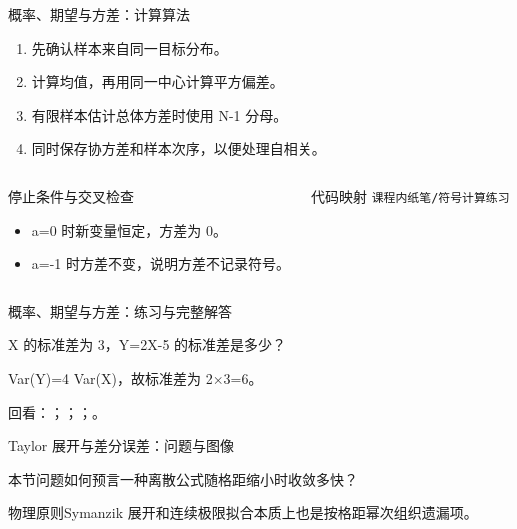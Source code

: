 \begin{frame}[t]{概率、期望与方差：计算算法}
\footnotesize
{}\begin{enumerate}
\item 先确认样本来自同一目标分布。
\item 计算均值，再用同一中心计算平方偏差。
\item 有限样本估计总体方差时使用 N-1 分母。
\item 同时保存协方差和样本次序，以便处理自相关。
\end{enumerate}\begin{columns}[T,onlytextwidth]
\begin{block}{停止条件与交叉检查}\scriptsize\begin{itemize}
\item[\CheckMark] a=0 时新变量恒定，方差为 0。
\item[\CheckMark] a=-1 时方差不变，说明方差不记录符号。
\end{itemize}\end{block}
\begin{block}{代码映射}
\scriptsize \texttt{课程内纸笔/\allowbreak{}符号计算练习}
\end{block}\end{columns}\end{frame}

\begin{frame}[t]{概率、期望与方差：练习与完整解答}
\footnotesize
\begin{block}{}X 的标准差为 3，Y=2X-5 的标准差是多少？\end{block}
\begin{exampleblock}{}Var(Y)=4 Var(X)，故标准差为 2\ensuremath{\times}3=6。\end{exampleblock}
\vfill
\scriptsize 回看：；；；。
\end{frame}

\begin{frame}[t]{Taylor 展开与差分误差：问题与图像}
\footnotesize
\begin{block}{本节问题}如何预言一种离散公式随格距缩小时收敛多快？\end{block}
\begin{block}{物理原则}\quad Symanzik 展开和连续极限拟合本质上也是按格距幂次组织遗漏项。\end{block}
\end{frame}

